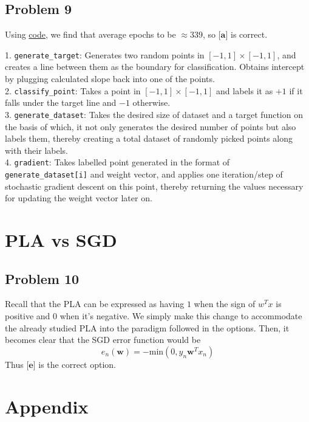 \documentclass{article}
\begin{document}
\subsection*{Problem 9}
Using \hyperref[prob8]{code}, we find that average epochs to be $\approx 339$, so $\textbf{[a]}$ is correct.
\newpage
\begin{codexpl*}
1. \verb|generate_target|: Generates two random points in $[-1,1]\times [-1,1]$, and creates a line between them as the boundary for classification. Obtains intercept by plugging calculated slope back into one of the points.\\
2. \verb|classify_point|: Takes a point in $[-1,1]\times[-1,1]$ and labels it as $+1$ if it falls under the target line and $-1$ otherwise. \\
3. \verb|generate_dataset|: Takes the desired size of dataset and a target function on the basis of which, it not only generates the desired number of points but also labels them, thereby creating a total dataset of randomly picked points along with their labels. \\
4. \verb|gradient|: Takes labelled point generated in the format of \verb|generate_dataset[i]| and weight vector, and applies one iteration/step of stochastic gradient descent on this point, thereby returning the values necessary for updating the weight vector later on. 
\end{codexpl*}
\section*{PLA vs SGD}
\subsection*{Problem 10}
Recall that the PLA can be expressed as having $1$ when the sign of $w^{T}x$ is positive and $0$ when it's negative. We simply make this change to accommodate the already studied PLA into the paradigm followed in the options. Then, it becomes clear that the SGD error function would be 
\begin{equation*}
    e_{n}(\mathbf{w}) = -\text{min}(0, y_{n}\mathbf{w}^{T}x_{n})
\end{equation*}
Thus $\textbf{[e]}$ is the correct option. 
\newpage
\section*{Appendix}
\end{document}
